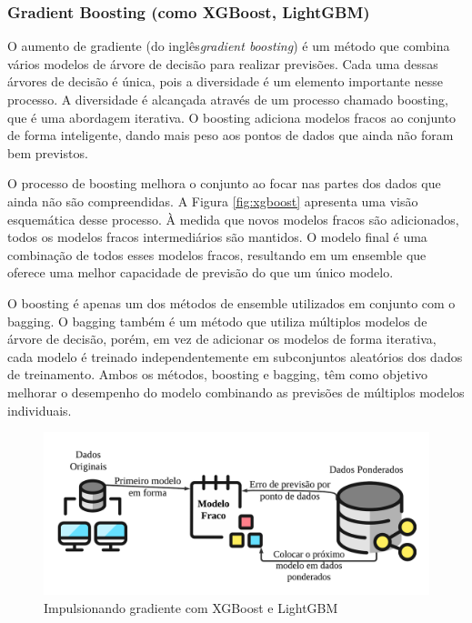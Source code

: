 \subsubsection{Gradient Boosting (como XGBoost, LightGBM)}\label{subsubsec:lgbxgb}

O aumento de gradiente (do inglês\textit{gradient boosting}) é um método que combina vários modelos de árvore de decisão para realizar previsões. Cada uma dessas árvores de decisão é única, pois a diversidade é um elemento importante nesse processo. A diversidade é alcançada através de um processo chamado boosting, que é uma abordagem iterativa. O boosting adiciona modelos fracos ao conjunto de forma inteligente, dando mais peso aos pontos de dados que ainda não foram bem previstos. 

O processo de boosting melhora o conjunto ao focar nas partes dos dados que ainda não são compreendidas. A Figura \ref{fig:xgboost} apresenta uma visão esquemática desse processo. À medida que novos modelos fracos são adicionados, todos os modelos fracos intermediários são mantidos. O modelo final é uma combinação de todos esses modelos fracos, resultando em um ensemble que oferece uma melhor capacidade de previsão do que um único modelo.

O boosting é apenas um dos métodos de ensemble utilizados em conjunto com o bagging. O bagging também é um método que utiliza múltiplos modelos de árvore de decisão, porém, em vez de adicionar os modelos de forma iterativa, cada modelo é treinado independentemente em subconjuntos aleatórios dos dados de treinamento. Ambos os métodos, boosting e bagging, têm como objetivo melhorar o desempenho do modelo combinando as previsões de múltiplos modelos individuais.


\begin{figure}[!htb]
	\centering
	\caption{Impulsionando gradiente com XGBoost e LightGBM}
	\label{fig:xgboos}
	\includegraphics[width=1\linewidth]{Modelos/Figuras/xgboos}
	
\end{figure}



